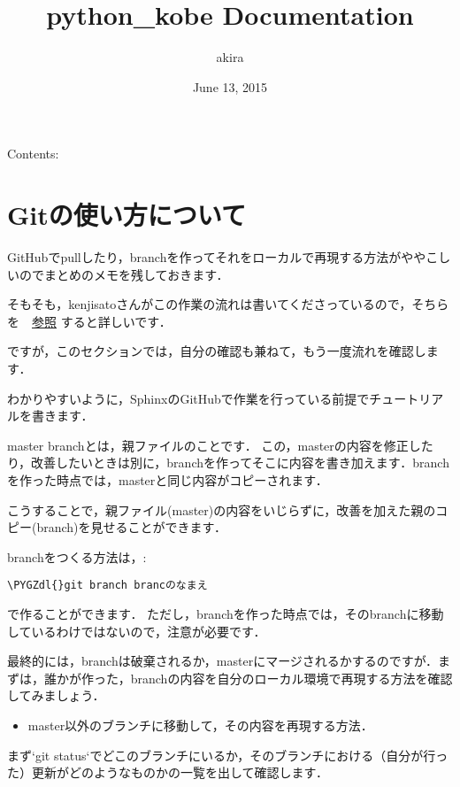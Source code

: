 \documentclass[letterpaper,10pt,english]{sphinxmanual}
\title{python\_kobe Documentation}
\date{June 13, 2015}
\author{akira}
\def\PYGZdl{\char`\$}
\begin{document}
\maketitle
\tableofcontents
{}\label{index::doc}


Contents:


\chapter{Gitの使い方について}
\label{chap1/sec1:python}\label{chap1/sec1:git}\label{chap1/sec1::doc}
GitHubでpullしたり，branchを作ってそれをローカルで再現する方法がややこしいのでまとめのメモを残しておきます．

そもそも，kenjisatoさんがこの作業の流れは書いてくださっているので，そちらを　\href{https://github.com/Akira55/sphinx/pull/7}{参照} すると詳しいです．

ですが，このセクションでは，自分の確認も兼ねて，もう一度流れを確認します．

わかりやすいように，SphinxのGitHubで作業を行っている前提でチュートリアルを書きます．

master branchとは，親ファイルのことです．
この，masterの内容を修正したり，改善したいときは別に，branchを作ってそこに内容を書き加えます．branchを作った時点では，masterと同じ内容がコピーされます．

こうすることで，親ファイル(master)の内容をいじらずに，改善を加えた親のコピー(branch)を見せることができます．

branchをつくる方法は，:

\begin{Verbatim}[commandchars=\\\{\}]
\PYGZdl{}git branch brancのなまえ
\end{Verbatim}

で作ることができます．
ただし，branchを作った時点では，そのbranchに移動しているわけではないので，注意が必要です．

最終的には，branchは破棄されるか，masterにマージされるかするのですが．まずは，誰かが作った，branchの内容を自分のローカル環境で再現する方法を確認してみましょう．
\begin{itemize}
\item {} 
master以外のブランチに移動して，その内容を再現する方法．

\end{itemize}

まず{}`git status{}`でどこのブランチにいるか，そのブランチにおける（自分が行った）更新がどのようなものかの一覧を出して確認します．
\end{document}
